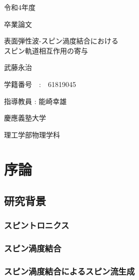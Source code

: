 \documentclass[dvipdfmx]{jsreport}
\numberwithin{equation}{chapter}
\numberwithin{table}{chapter}
\begin{document}
\begin{titlepage}
	\begin{center}
		
		{\large 令和4年度}
		
		\vspace{10truept}
		
		{\large 卒業論文}
		
		\vspace*{100truept}
		
		{\huge 表面弾性波-スピン渦度結合における\\スピン軌道相互作用の寄与} 
		
		\vspace{80truept}
		
		{\LARGE 武藤永治}
		
		\vspace{5truept}
		
		{\Large 学籍番号　:　61819045}
		
		\vspace{70truept}
		
		{\Large 指導教員 : 能崎幸雄}
		
		\vspace{70truept}
		
		{\Large 慶應義塾大学}
		
		\vspace{10truept}
		
		{\Large 理工学部物理学科}
		
    
		
	\end{center}
\end{titlepage}

\setcounter{tocdepth}{3}
\tableofcontents
\clearpage

\chapter{序論}
\section{研究背景}
\subsection{スピントロニクス}
\subsection{スピン渦度結合}
\subsection{スピン渦度結合によるスピン流生成}
\end{document}
